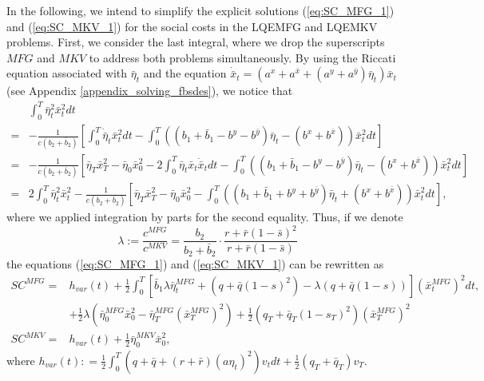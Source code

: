 \documentclass[11pt]{article}
\begin{document}
In the following, we intend to simplify the explicit solutions (\ref{eq:SC_MFG_1}) and (\ref{eq:SC_MKV_1}) for the social costs in the LQEMFG and LQEMKV problems. First, we consider the last integral, where we drop the superscripts ${MFG}$ and ${MKV}$ to address both problems simultaneously. By using the Riccati equation associated with $\bar{\eta}_t$ and the equation $\dot{\bar{x}}_t = (a^x+a^{\bar{x}}+(a^y+a^{\bar{y}})\bar{\eta}_t)\bar{x}_t$ (see Appendix \ref{appendix_solving_fbsdes}), we notice that
\begin{equation*}
\begin{split}
	&\int_0^T \bar{\eta}_t^2 \bar{x}_t^2 dt\\
	=& - \frac{1}{c(b_2 + \bar{b}_2)} \left[ \int_0^T \dot{\bar{\eta}}_t \bar{x}_t^2 dt -  \int_0^T ( (b_1 + \bar{b}_1 - b^y - b^{\bar{y}}) \bar{\eta}_t - (b^x + b^{\bar{x}}) ) \bar{x}_t^2 dt \right]\\
	= & - \frac{1}{c(b_2 + \bar{b}_2)} \left[ \bar{\eta}_T\bar{x}_T^2-\bar{\eta}_0\bar{x}_0^2-2\int_0^T\bar{\eta}_t\bar{x}_t\dot{\bar{x}}_t dt -  \int_0^T ( (b_1 + \bar{b}_1 - b^y - b^{\bar{y}}) \bar{\eta}_t - (b^x + b^{\bar{x}}) ) \bar{x}_t^2 dt \right] \\
	= & 2 \int_0^T \bar{\eta}_t^2 \bar{x}_t^2  - \frac{1}{c(b_2 + \bar{b}_2)} \left[ \bar{\eta}_T \bar{x}_T^2 - \bar{\eta}_0 \bar{x}_0^2 - \int_0^T  ((b_1 + \bar{b}_1 + b^y + b^{\bar{y}} ) \bar{\eta}_t + (b^x + b^{\bar{x}}) ) \bar{x}_t^2 dt \right],
\end{split}
\end{equation*}
where we applied integration by parts for the second equality. Thus, if we denote
\begin{equation*}
	\lambda := \frac{c^{MFG}}{c^{MKV}} = \frac{b_2}{b_2 + \bar{b}_2}\cdot \frac{ r + \bar{r}(1-\bar{s})^2 }{r + \bar{r}(1-\bar{s})}
\end{equation*}
the equations (\ref{eq:SC_MFG_1}) and (\ref{eq:SC_MKV_1}) can be rewritten as
\begin{equation}
\begin{split}
	SC^{MFG} = & h_{var}(t) +  \frac{1}{2} \int_0^T \left[ \bar{b}_1 \lambda \bar{\eta}_t^{MFG} + (q+ \bar{q}(1-s)^2) - \lambda (q + \bar{q}(1-s)) \right] (\bar{x}_t^{MFG})^2 dt, \\
	& + \frac{1}{2} \lambda \left( \bar{\eta}^{MFG}_0 \bar{x}_0^2 - \bar{\eta}^{MFG}_T (\bar{x}_T^{MFG})^2 \right) + \frac{1}{2} (q_T+\bar{q}_T(1-s_T)^2)(\bar{x}_T^{MFG})^2\\
	SC^{MKV} = & h_{var}(t) + \frac{1}{2} \bar{\eta}^{MKV}_0 \bar{x}_0^2,
\end{split}
\label{eq:SC_MFG_MKV_2}
\end{equation}
where $ h_{var}(t): = \frac{1}{2}\int_0^T (q+\bar{q}+(r+\bar{r})(a\eta_t)^2)v_tdt + \frac{1}{2}(q_T+\bar{q}_T)v_T  $.
\end{document}

